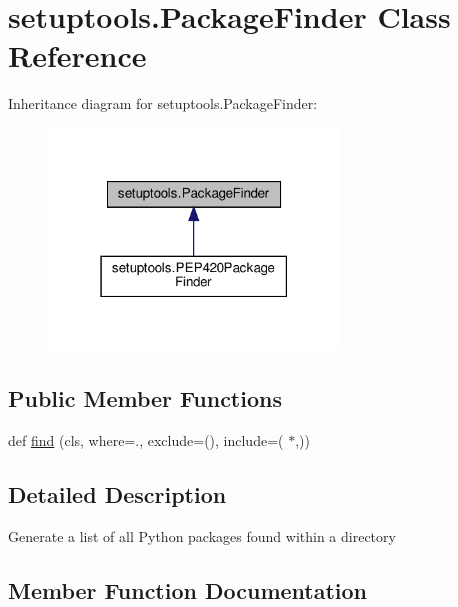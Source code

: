 \hypertarget{classsetuptools_1_1PackageFinder}{}\section{setuptools.\+Package\+Finder Class Reference}
\label{classsetuptools_1_1PackageFinder}


Inheritance diagram for setuptools.\+Package\+Finder\+:
\nopagebreak
\begin{figure}[H]
\begin{center}
\leavevmode
\includegraphics[width=219pt]{classsetuptools_1_1PackageFinder__inherit__graph}
\end{center}
\end{figure}
\subsection*{Public Member Functions}
\begin{DoxyCompactItemize}
\item 
def \hyperlink{classsetuptools_1_1PackageFinder_a0ccdb7e47a8fbb515482bf3e6044e7ac}{find} (cls, where=\textquotesingle{}.\textquotesingle{}, exclude=(), include=(\textquotesingle{} $\ast$\textquotesingle{},))
\end{DoxyCompactItemize}


\subsection{Detailed Description}
\begin{DoxyVerb}Generate a list of all Python packages found within a directory
\end{DoxyVerb}
 

\subsection{Member Function Documentation}
\mbox{\label{classsetuptools_1_1PackageFinder_a0ccdb7e47a8fbb515482bf3e6044e7ac}} 

